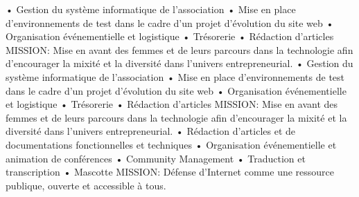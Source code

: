\documentclass[
	a4paper,
	maincolor=re,
	sidecolor=bg-2,
	sidetextcolor=tex-3,
	sectioncolor=re,
	subsectioncolor=tex-2,
	itemtextcolor=tex-3,
	profilepicsize=3.5cm,
	profilepicborderwidth=2pt,
]{fortysecondscv}
\begin{document}
\begin{cvtable}[2.5]
    {
        • Gestion du système informatique de l’association\newline
        • Mise en place d’environnements de test dans le cadre d’un projet 
        d’évolution du site web\newline
        • Organisation événementielle et logistique\newline
        • Trésorerie\newline
        • Rédaction d’articles\newline
        MISSION: Mise en avant des femmes et de leurs parcours dans la 
        technologie afin d'encourager la mixité et la diversité dans l’univers 
        entrepreneurial.\newline
    }
    {
        • Gestion du système informatique de l’association\newline
        • Mise en place d’environnements de test dans le cadre d’un projet 
        d’évolution du site web\newline
        • Organisation événementielle et logistique\newline
        • Trésorerie\newline
        • Rédaction d’articles\newline
        MISSION: Mise en avant des femmes et de leurs parcours dans la 
        technologie afin d'encourager la mixité et la diversité dans l’univers 
        entrepreneurial.\newline
    }
    {    
        • Rédaction d’articles et de documentations fonctionnelles et \newline
        techniques\newline
        • Organisation événementielle et animation de conférences\newline
        • Community Management\newline
        • Traduction et transcription\newline
        • Mascotte\newline
        MISSION: Défense d’Internet comme une ressource publique, ouverte et 
        accessible à tous.\newline
	}

\end{cvtable}
\end{document}
